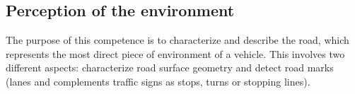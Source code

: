 

\subsection{Perception of the environment}
The purpose of this competence is to characterize and describe the road, which
represents the most direct piece of environment of a vehicle. This 
involves two different aspects: characterize road surface geometry and detect road marks (lanes
and complements traffic signs as stops, turns or stopping lines).



